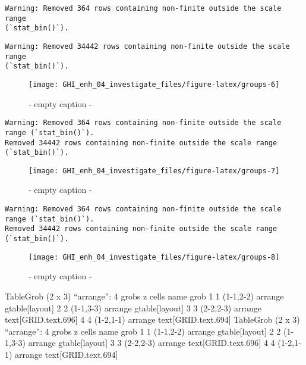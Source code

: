 \documentclass[
  10pt,
  a4paper,oneside]{article}
\begin{document}
\begin{verbatim}
Warning: Removed 364 rows containing non-finite outside the scale range
(`stat_bin()`).
\end{verbatim}

\begin{verbatim}
Warning: Removed 34442 rows containing non-finite outside the scale range
(`stat_bin()`).
\end{verbatim}

\begin{figure}[H]

{\centering \texttt{[image: GHI\_enh\_04\_investigate\_files/figure-latex/groups-6]} 

}

\caption{ - empty caption - }\label{fig:groups-6}
\end{figure}

\begin{verbatim}
Warning: Removed 364 rows containing non-finite outside the scale range (`stat_bin()`).
Removed 34442 rows containing non-finite outside the scale range (`stat_bin()`).
\end{verbatim}

\begin{figure}[H]

{\centering \texttt{[image: GHI\_enh\_04\_investigate\_files/figure-latex/groups-7]} 

}

\caption{ - empty caption - }\label{fig:groups-7}
\end{figure}

\begin{verbatim}
Warning: Removed 364 rows containing non-finite outside the scale range (`stat_bin()`).
Removed 34442 rows containing non-finite outside the scale range (`stat_bin()`).
\end{verbatim}

\begin{figure}[H]

{\centering \texttt{[image: GHI\_enh\_04\_investigate\_files/figure-latex/groups-8]} 

}

\caption{ - empty caption - }\label{fig:groups-8}
\end{figure}

TableGrob (2 x 3) ``arrange'': 4 grobs
z cells name grob
1 1 (1-1,2-2) arrange gtable{[}layout{]}
2 2 (1-1,3-3) arrange gtable{[}layout{]}
3 3 (2-2,2-3) arrange text{[}GRID.text.696{]}
4 4 (1-2,1-1) arrange text{[}GRID.text.694{]}
TableGrob (2 x 3) ``arrange'': 4 grobs
z cells name grob
1 1 (1-1,2-2) arrange gtable{[}layout{]}
2 2 (1-1,3-3) arrange gtable{[}layout{]}
3 3 (2-2,2-3) arrange text{[}GRID.text.696{]}
4 4 (1-2,1-1) arrange text{[}GRID.text.694{]}
\end{document}

